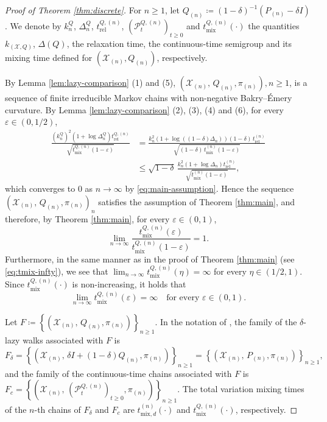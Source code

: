 \documentclass[a4paper, reqno, 11pt]{amsart}
\theoremstyle{definition}
\begin{document}
\begin{proof}[Proof of Theorem \ref{thm:discrete}]
For $n \ge 1$, let $Q_{(n)} \coloneqq (1-\delta)^{-1}\left(P_{(n)} - \delta I\right)$.
We denote by $k_n^{Q}$, $\Delta_n^{Q}$, $t_{\mathrm{rel}}^{Q,(n)}$, $(\mathscr{P}_t^{Q,(n)})_{t \ge 0}$ and $t_{\mathrm{mix}}^{Q,(n)}(\cdot)$
the quantities $k_{(\mathcal{X}, Q)}$, $\Delta(Q)$, the relaxation time, the continuous-time semigroup and its mixing time defined for $(\mathcal{X}_{(n)}, Q_{(n)})$, respectively.

By Lemma \ref{lem:lazy-comparison} (1) and (5),
$\left(\mathcal{X}_{(n)},\,Q_{(n)},\pi_{(n)}\right), n \ge 1$, is a sequence of finite irreducible Markov chains with non-negative Bakry--\'Emery curvature.
By Lemma \ref{lem:lazy-comparison} (2), (3), (4) and (6), for every $\varepsilon \in \left(0,1/2\right)$,
\begin{align*} 
\frac{(k_n^{Q})^{2}\left(1+\log \Delta_n^{Q}\right) t_{\mathrm{rel}}^{Q,(n)}}{\sqrt{t_{\mathrm{mix}}^{Q,(n)}(1-\varepsilon)}}
&= \frac{k_n^{2}\left(1+\log\left((1-\delta)\Delta_n\right)\right) (1-\delta)\,t_{\mathrm{rel}}^{(n)}}{\sqrt{(1-\delta)\,t_{\mathrm{mix}}^{(n)}(1-\varepsilon)}} \\
&\le \sqrt{1-\delta}\,\frac{k_n^{2}\left(1+\log \Delta_n\right) t_{\mathrm{rel}}^{(n)}}{\sqrt{t_{\mathrm{mix}}^{(n)}(1-\varepsilon)}}, 
\end{align*}
which converges to $0$ as $n \to \infty$ by \eqref{eq:main-assumption}.
Hence the sequence $\left(\mathcal{X}_{(n)},\,Q_{(n)},\pi_{(n)}\right)_{n}$ satisfies the assumption of Theorem \ref{thm:main},
and therefore, by Theorem \ref{thm:main}, for every $\varepsilon \in (0,1)$,
\begin{equation}\label{eq:Q-cutoff}
\lim_{n\to\infty} \frac{t_{\mathrm{mix}}^{Q,(n)}(\varepsilon)}{t_{\mathrm{mix}}^{Q,(n)}(1-\varepsilon)} = 1.
\end{equation}
Furthermore, in the same manner as in the proof of Theorem \ref{thm:main} (see \eqref{eq:tmix-infty}),
we see that $\lim_{n\to\infty} t_{\mathrm{mix}}^{Q,(n)}(\eta) = \infty$ for every $\eta \in \left(1/2,1\right)$.
Since $t_{\mathrm{mix}}^{Q,(n)}(\cdot)$ is non-increasing, it holds that
\begin{equation}\label{eq:Q-tmix-infty}
\lim_{n\to\infty} t_{\mathrm{mix}}^{Q,(n)}(\varepsilon) = \infty \quad \text{for every } \varepsilon \in (0,1).
\end{equation}

Let $F \coloneqq \left\{\left(\mathcal{X}_{(n)},\,Q_{(n)},\pi_{(n)}\right) \right\}_{n \ge 1}$.
In the notation of \cite{CSC2013},
the family of the $\delta$-lazy walks associated with $F$ is
\[ F_{\delta} = \left\{\left(\mathcal{X}_{(n)},\,\delta I + (1-\delta) Q_{(n)},\pi_{(n)}\right) \right\}_{n \ge 1} = \left\{\left(\mathcal{X}_{(n)},\,P_{(n)},\pi_{(n)}\right)  \right\}_{n \ge 1}, \]
and the family of the continuous-time chains associated with $F$ is
$F_{c} = \left\{\left(\mathcal{X}_{(n)},\,(\mathscr{P}_t^{Q,(n)})_{t \ge 0},\pi_{(n)}\right)  \right\}_{n \ge 1}$.
The total variation mixing times of the $n$-th chains of $F_{\delta}$ and $F_{c}$ are $t_{\mathrm{mix},d}^{(n)}(\cdot)$ and $t_{\mathrm{mix}}^{Q,(n)}(\cdot)$, respectively.


\end{proof}
\end{document}
